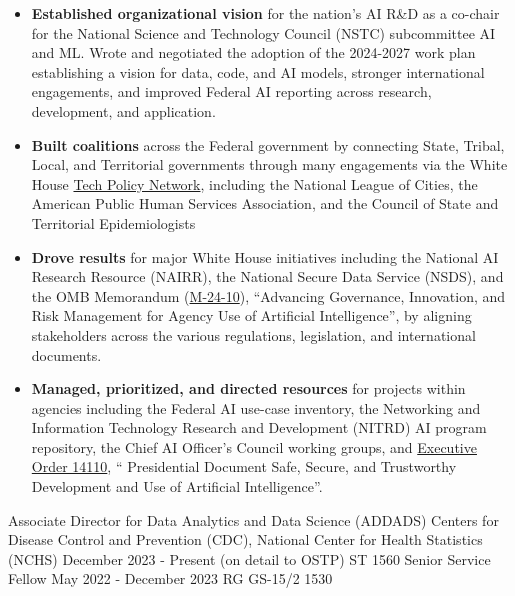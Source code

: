 \documentclass[]{scrartcl}
\begin{document}
\begin{cleanCV}
{\begin{itemize}
  \item \textbf{Established organizational vision} for the nation's AI R\&D as a co-chair for the National Science and Technology Council (NSTC) subcommittee AI and ML. Wrote and negotiated the adoption of the 2024-2027 work plan establishing a vision for data, code, and AI models, stronger international engagements, and improved Federal AI reporting across research, development, and application.
  \item \textbf{Built coalitions} across the Federal government by connecting State, Tribal, Local, and Territorial governments through many engagements via the White House \href{https://www.whitehouse.gov/ostp/news-updates/2023/11/13/readout-of-roundtable-with-state-local-tribal-and-territorial-leaders-on-tech-policy/}{Tech Policy Network}, including the National League of Cities, the American Public Human Services Association, and the Council of State and Territorial Epidemiologists
  \item \textbf{Drove results} for major White House initiatives including the National AI Research Resource (NAIRR), the National Secure Data Service (NSDS), and the OMB Memorandum (\href{https://www.whitehouse.gov/wp-content/uploads/2024/03/M-24-10-Advancing-Governance-Innovation-and-Risk-Management-for-Agency-Use-of-Artificial-Intelligence.pdf}{M-24-10}), ``Advancing Governance, Innovation, and Risk Management for Agency Use of Artificial Intelligence'', by aligning stakeholders across the various regulations, legislation, and international documents.
  \item \textbf{Managed, prioritized, and directed resources} for projects within agencies including the Federal AI use-case inventory, the Networking and Information Technology Research and Development (NITRD) AI program repository, the Chief AI Officer's Council working groups, and \href{https://www.federalregister.gov/documents/2023/11/01/2023-24283/safe-secure-and-trustworthy-development-and-use-of-artificial-intelligence}{Executive Order 14110}, `` Presidential Document Safe, Secure, and Trustworthy Development and Use of Artificial Intelligence''.

  \end{itemize}
}

\WorkExperience
{}
{Associate Director for Data Analytics and Data Science (ADDADS)}
{
  \newline Centers for Disease Control and Prevention (CDC), National Center for Health Statistics (NCHS)
  \newline December 2023 - Present (on detail to OSTP)
  \newline ST 1560
  \newline
  \newline Senior Service Fellow
  \newline May 2022 - December 2023
  \newline RG GS-15/2 1530
}
{
  \vspace{-0.25em}
  \begin{itemize}


\end{itemize}}
\end{cleanCV}
\end{document}
